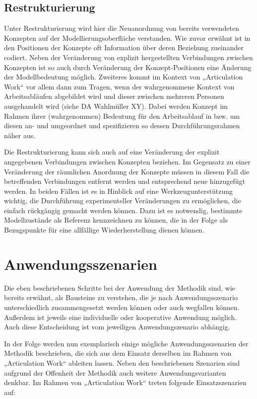 \subsection{Restrukturierung}

Unter Restrukturierung wird hier die Neuanordnung von bereits verwendeten Konzepten auf der Modellierungsoberfläche verstanden. Wie zuvor erwähnt ist in den Positionen der Konzepte oft Information über deren Beziehung zueinander codiert. Neben der Veränderung von explizit hergestellten Verbindungen zwischen Konzepten ist so auch durch Veränderung der Konzept-Positionen eine Änderung der Modellbedeutung möglich. Zweiteres kommt im Kontext von „Articulation Work“ vor allem dann zum Tragen, wenn der wahrgenommene Kontext von Arbeitsabläufen abgebildet wird und dieser zwischen mehreren Personen ausgehandelt wird (siehe DA Wahlmüller XY). Dabei werden Konzept im Rahmen ihrer (wahrgenommen) Bedeutung für den Arbeitsablauf in bzw. um diesen an- und umgeordnet und spezifizieren so dessen Durchführungsrahmen näher aus. 

Die Restrukturierung kann sich auch auf eine Veränderung der explizit angegebenen Verbindungen zwischen Konzepten beziehen. Im Gegensatz zu einer Veränderung der räumlichen Anordnung der Konzepte müssen in diesem Fall die betreffenden Verbindungen entfernt werden und entsprechend neue hinzugefügt werden. In beiden Fällen ist es in Hinblick auf eine Werkzeugunterstützung wichtig, die Durchführung experimenteller Veränderungen zu ermöglichen, die einfach rückgängig gemacht werden können. Dazu ist es notwendig, bestimmte Modellzustände als Referenz kennzeichnen zu können, die in der Folge als Bezugspunkte für eine allfällige Wiederherstellung dienen können.


\section{Anwendungsszenarien}

Die eben beschriebenen Schritte bei der Anwendung der Methodik sind, wie bereits erwähnt, als Bausteine zu verstehen, die je nach Anwendungsszenario unterschiedlich zusammengesetzt werden können oder auch wegfallen können. Außerdem ist jeweils eine individuelle oder kooperative Anwendung möglich. Auch diese Entscheidung ist vom jeweiligen Anwendungszenario abhängig.

In der Folge werden nun exemplarisch einige mögliche Anwendungsszenarien der Methodik beschrieben, die sich aus dem Einsatz derselben im Rahmen von „Articulation Work“ ableiten lassen. Neben den beschriebenen Szenarien sind aufgrund der Offenheit der Methodik auch weitere Anwendungsvarianten denkbar. Im Rahmen von „Articulation Work“ treten folgende Einsatzszenarien auf:

